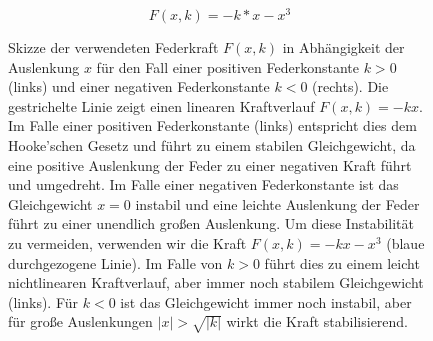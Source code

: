 {\[
    F(x, k) = -k *  x -  x^3
\]}

\begin{figure}[htbp!]
    \centering
    \caption{Skizze der verwendeten Federkraft $F(x,k)$ in
    Abhängigkeit der Auslenkung $x$ für den Fall einer positiven
    Federkonstante $k>0$ (links) und einer negativen Federkonstante $k<0$
    (rechts). Die gestrichelte Linie zeigt einen linearen Kraftverlauf
    $F(x,k) = -kx$.  Im Falle einer positiven Federkonstante (links)
    entspricht dies dem Hooke'schen Gesetz und führt zu einem stabilen
    Gleichgewicht, da eine positive Auslenkung der Feder zu einer
    negativen Kraft führt und umgedreht. Im Falle einer negativen
    Federkonstante ist das Gleichgewicht $x=0$ instabil und eine leichte
    Auslenkung der Feder führt zu einer unendlich großen Auslenkung. Um
    diese Instabilität zu vermeiden, verwenden wir die Kraft $F(x,k) = -kx -
    x^3$ (blaue durchgezogene Linie). Im Falle von $k>0$ führt dies zu
    einem leicht nichtlinearen Kraftverlauf, aber immer noch stabilem
    Gleichgewicht (links). Für $k<0$ ist das Gleichgewicht immer noch
    instabil, aber für große Auslenkungen $|x| > \sqrt{|k|}$ wirkt die
    Kraft stabilisierend.}
    \label{fig:force}
\end{figure}

